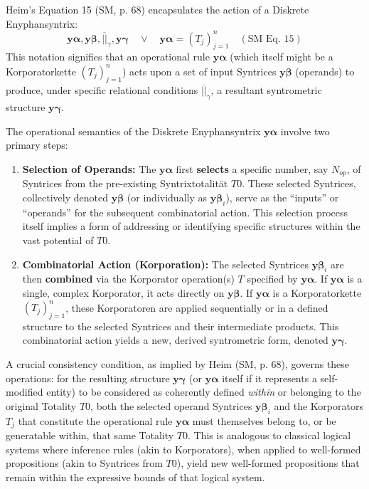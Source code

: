 \documentclass[
    12pt,              %
    a4paper,           %
    headings=normal,   %
    twoside=true,      %
    BCOR=8mm,          %
]{scrbook}
\newcommand{\q}[1]{\enquote{#1}}
\newcommand{\syntrixtotalitaet}{T0}
\newcommand{\diskreteEnyphansyntrix}{\bm{y\alpha}}
\begin{document}
Heim’s Equation 15 (SM, p. 68) encapsulates the action of a Diskrete Enyphansyntrix:
\begin{equation} \label{eq:original_diskrete_enyphansyntrix} 
\diskreteEnyphansyntrix, \bm{y\beta}, \overline{||}_\gamma, \bm{y\gamma} \quad \lor \quad \diskreteEnyphansyntrix = (T_j)^n_{j=1} \quad (\text{SM Eq. 15})
\end{equation}
This notation signifies that an operational rule \(\diskreteEnyphansyntrix\) (which itself might be a Korporatorkette \((T_j)^n_{j=1}\)) acts upon a set of input Syntrices \(\bm{y\beta}\) (operands) to produce, under specific relational conditions \(\overline{||}_\gamma\), a resultant syntrometric structure \(\bm{y\gamma}\).

The operational semantics of the Diskrete Enyphansyntrix \(\diskreteEnyphansyntrix\) involve two primary steps:
\begin{enumerate}[label=(\alph*)]
    \item  \textbf{Selection of Operands:} The \(\diskreteEnyphansyntrix\) first \textbf{selects} a specific number, say \(N_{op}\), of Syntrices from the pre-existing Syntrixtotalität \(\syntrixtotalitaet\). These selected Syntrices, collectively denoted \(\bm{y\beta}\) (or individually as \(\bm{y\beta}_i\)), serve as the \q{inputs} or \q{operands} for the subsequent combinatorial action. This selection process itself implies a form of addressing or identifying specific structures within the vast potential of \(\syntrixtotalitaet\).

    \item  \textbf{Combinatorial Action (Korporation):} The selected Syntrices \(\bm{y\beta}_i\) are then \textbf{combined} via the Korporator operation(s) \(T\) specified by \(\diskreteEnyphansyntrix\). If \(\diskreteEnyphansyntrix\) is a single, complex Korporator, it acts directly on \(\bm{y\beta}\). If \(\diskreteEnyphansyntrix\) is a Korporatorkette \((T_j)^n_{j=1}\), these Korporatoren are applied sequentially or in a defined structure to the selected Syntrices and their intermediate products. This combinatorial action yields a new, derived syntrometric form, denoted \(\bm{y\gamma}\).
\end{enumerate}
A crucial consistency condition, as implied by Heim (SM, p. 68), governs these operations: for the resulting structure \(\bm{y\gamma}\) (or \(\diskreteEnyphansyntrix\) itself if it represents a self-modified entity) to be considered as coherently defined \textit{within} or belonging to the original Totality \(\syntrixtotalitaet\), both the selected operand Syntrices \(\bm{y\beta}_i\) and the Korporators \(T_j\) that constitute the operational rule \(\diskreteEnyphansyntrix\) must themselves belong to, or be generatable within, that same Totality \(\syntrixtotalitaet\). This is analogous to classical logical systems where inference rules (akin to Korporators), when applied to well-formed propositions (akin to Syntrices from \(\syntrixtotalitaet\)), yield new well-formed propositions that remain within the expressive bounds of that logical system.
\end{document}
